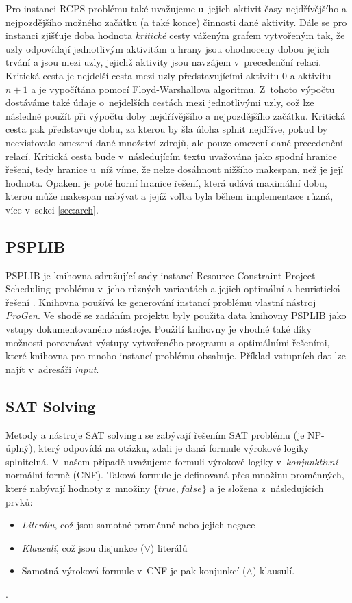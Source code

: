 \documentclass[a4paper, 12pt]{article}
\newcommand{\rcps}[0]{Resource Constraint Project Scheduling}
\begin{document}
Pro instanci RCPS problému také uvažujeme u~jejich aktivit časy nejdřívějšího a nejpozdějšího možného začátku (a
také konce) činnosti dané aktivity.
Dále se pro instanci zjišťuje doba hodnota \emph{kritické} cesty váženým grafem vytvořeným tak, že uzly odpovídají jednotlivým
aktivitám a hrany jsou ohodnoceny dobou jejich trvání a jsou mezi uzly, jejichž aktivity jsou navzájem v~precedenční
relaci.
Kritická cesta je nejdelší cesta mezi uzly představujícími aktivitu $0$ a aktivitu $n+1$ a je vypočítána
pomocí Floyd-Warshallova algoritmu.
Z~tohoto výpočtu dostáváme také údaje o~nejdelších cestách mezi jednotlivými uzly, což lze následně použít
při výpočtu doby nejdřívějšího a nejpozdějšího začátku.
Kritická cesta pak představuje dobu, za kterou by šla úloha splnit nejdříve, pokud by neexistovalo omezení dané
množství zdrojů, ale pouze omezení dané precedenční relací.
Kritická cesta bude v~následujícím textu uvažována jako spodní hranice řešení, tedy hranice u~níž víme, že nelze
dosáhnout nižšího makespan, než je její hodnota.
Opakem je poté horní hranice řešení, která udává maximální dobu, kterou může makespan nabývat a jejíž volba
byla během implementace různá, více v~sekci \ref{sec:arch}.

\subsection{PSPLIB}
PSPLIB je knihovna sdružující sady instancí \rcps\ problému v~jeho různých variantách a jejich optimální a heuristická řešení \cite{psplib}.
Knihovna používá ke generování instancí problému vlastní nástroj \emph{ProGen}.
Ve shodě se zadáním projektu byly použita data knihovny PSPLIB jako vstupy dokumentovaného nástroje.
Použití knihovny je vhodné také díky možnosti porovnávat výstupy vytvořeného programu s~optimálními řešeními, které
knihovna pro mnoho instancí problému obsahuje.
Příklad vstupních dat lze najít v~adresáři \emph{input}.

\subsection{SAT Solving}
Metody a nástroje SAT solvingu se zabývají řešením SAT problému (je NP-úplný),
který odpovídá na otázku, zdali je daná formule výrokové logiky splnitelná.
V~našem případě uvažujeme formuli výrokové logiky v~\emph{konjunktivní} normální formě (CNF).
Taková formule je definovaná přes množinu proměnných, které nabývají hodnoty z~množiny $\{true, false\}$
a je složena z~následujících prvků:
 \begin{itemize}
 	\item \emph{Literálu}, což jsou samotné proměnné nebo jejich negace
 	\item \emph{Klausulí}, což jsou disjunkce ($\vee$) literálů
	\item Samotná výroková formule v~CNF je pak konjunkcí ($\wedge$) klausulí.
 \end{itemize}.
\end{document}
